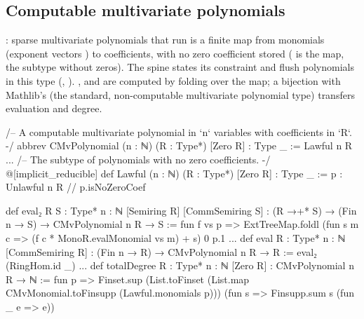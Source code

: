 \subsection{Computable multivariate polynomials}\label{sec:gen-lib-comppoly-mv}

\begin{define}{: sparse multivariate polynomials that run}
 is a finite map from monomials (exponent vectors ) to
coefficients, with no zero coefficient stored ( is the map,  the
subtype without zeros). The spine states its constraint and flush polynomials in this type
(\allowbreak{}\allowbreak{}\allowbreak{}, ). ,
 and  are computed by folding over the map; a bijection with
Mathlib's  (the standard, non-computable multivariate polynomial type)
transfers evaluation and degree.
\end{define}

\begin{leancode}
/-- A computable multivariate polynomial in `n` variables with coefficients in `R`. -/
abbrev CMvPolynomial (n : ℕ) (R : Type*) [Zero R] : Type _ := Lawful n R
...
/-- The subtype of polynomials with no zero coefficients. -/
@[implicit_reducible]
def Lawful (n : ℕ) (R : Type*) [Zero R] : Type _ :=
  {p : Unlawful n R // p.isNoZeroCoef}
\end{leancode}



\begin{leancode}
def eval₂ {R S : Type*} {n : ℕ} [Semiring R] [CommSemiring S] :
    (R →+* S) → (Fin n → S) → CMvPolynomial n R → S :=
  fun f vs p => ExtTreeMap.foldl (fun s m c => (f c * MonoR.evalMonomial vs m) + s) 0 p.1
...
def eval {R : Type*} {n : ℕ} [CommSemiring R] : (Fin n → R) → CMvPolynomial n R → R :=
  eval₂ (RingHom.id _)
...
def totalDegree {R : Type*} {n : ℕ} [Zero R] : CMvPolynomial n R → ℕ :=
  fun p => Finset.sup (List.toFinset (List.map CMvMonomial.toFinsupp (Lawful.monomials p)))
    (fun s => Finsupp.sum s (fun _ e => e))
\end{leancode}



